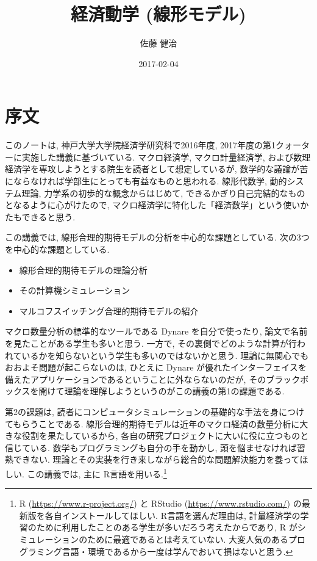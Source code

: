 \documentclass[a4paper]{scrbook}
\title{経済動学 (線形モデル)}
\author{佐藤 健治}
\date{2017-02-04}
\providecommand{\tightlist}{%
  \setlength{\itemsep}{0pt}\setlength{\parskip}{0pt}}
\theoremstyle{definition}
\begin{document}
\maketitle

{
\setcounter{tocdepth}{1}
\tableofcontents
}
\chapter*{序文}

このノートは, 神戸大学大学院経済学研究科で2016年度,
2017年度の第1クォーターに実施した講義に基づいている. マクロ経済学,
マクロ計量経済学,
および数理経済学を専攻しようとする院生を読者として想定しているが,
数学的な議論が苦にならなければ学部生にとっても有益なものと思われる.
線形代数学, 動的システム理論, 力学系の初歩的な概念からはじめて,
できるかぎり自己完結的なものとなるように心がけたので,
マクロ経済学に特化した「経済数学」という使いかたもできると思う.

この講義では, 線形合理的期待モデルの分析を中心的な課題としている.
次の3つを中心的な課題としている.

\begin{itemize}
\tightlist
\item
  線形合理的期待モデルの理論分析
\item
  その計算機シミュレーション
\item
  マルコフスイッチング合理的期待モデルの紹介
\end{itemize}

マクロ数量分析の標準的なツールである Dynare を自分で使ったり,
論文で名前を見たことがある学生も多いと思う. 一方で,
その裏側でどのような計算が行われているかを知らないという学生も多いのではないかと思う.
理論に無関心でもおおよそ問題が起こらないのは, ひとえに Dynare
が優れたインターフェイスを備えたアプリケーションであるということに外ならないのだが,
そのブラックボックスを開けて理論を理解しようというのがこの講義の第1の課題である.

第2の課題は,
読者にコンピュータシミュレーションの基礎的な手法を身につけてもらうことである.
線形合理的期待モデルは近年のマクロ経済の数量分析に大きな役割を果たしているから,
各自の研究プロジェクトに大いに役に立つものと信じている.
数学もプログラミングも自分の手を動かし, 頭を悩ませなければ習熟できない.
理論とその実装を行き来しながら総合的な問題解決能力を養ってほしい.
この講義では, 主に R言語を用いる.\footnote{R
  (\url{https://www.r-project.org/}) と RStudio
  (\url{https://www.rstudio.com/}) の最新版を各自インストールしてほしい.
  R言語を選んだ理由は,
  計量経済学の学習のために利用したことのある学生が多いだろう考えたからであり,
  R がシミュレーションのために最適であるとは考えていない.
  大変人気のあるプログラミング言語・環境であるから一度は学んでおいて損はないと思う.}
\end{document}
